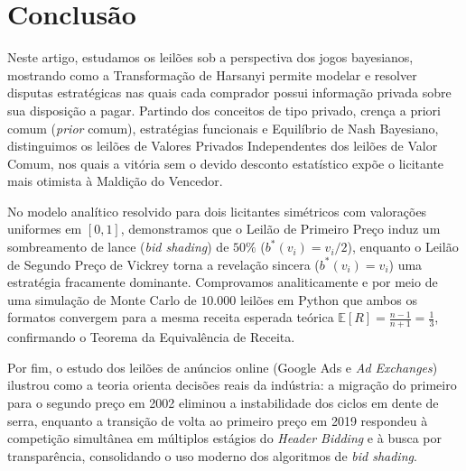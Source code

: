 \section{Conclusão}
\label{sec:conclusao}

Neste artigo, estudamos os leilões sob a perspectiva dos jogos bayesianos, mostrando como a Transformação de Harsanyi permite modelar e resolver disputas estratégicas nas quais cada comprador possui informação privada sobre sua disposição a pagar. Partindo dos conceitos de tipo privado, crença a priori comum (\textit{prior} comum), estratégias funcionais e Equilíbrio de Nash Bayesiano, distinguimos os leilões de Valores Privados Independentes dos leilões de Valor Comum, nos quais a vitória sem o devido desconto estatístico expõe o licitante mais otimista à Maldição do Vencedor.

No modelo analítico resolvido para dois licitantes simétricos com valorações uniformes em $[0, 1]$, demonstramos que o Leilão de Primeiro Preço induz um sombreamento de lance (\textit{bid shading}) de $50\%$ ($b^*(v_i) = v_i/2$), enquanto o Leilão de Segundo Preço de Vickrey torna a revelação sincera ($b^*(v_i) = v_i$) uma estratégia fracamente dominante. Comprovamos analiticamente e por meio de uma simulação de Monte Carlo de $10.000$ leilões em Python que ambos os formatos convergem para a mesma receita esperada teórica $\mathbb{E}[R] = \frac{n-1}{n+1} = \frac{1}{3}$, confirmando o Teorema da Equivalência de Receita.

Por fim, o estudo dos leilões de anúncios online (Google Ads e \textit{Ad Exchanges}) ilustrou como a teoria orienta decisões reais da indústria: a migração do primeiro para o segundo preço em 2002 eliminou a instabilidade dos ciclos em dente de serra, enquanto a transição de volta ao primeiro preço em 2019 respondeu à competição simultânea em múltiplos estágios do \textit{Header Bidding} e à busca por transparência, consolidando o uso moderno dos algoritmos de \textit{bid shading}.
